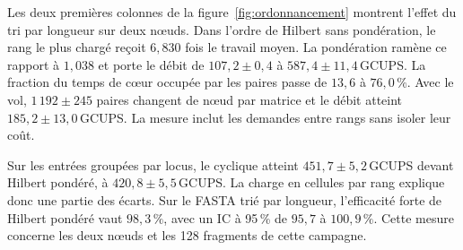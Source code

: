 Les deux premières colonnes de la figure~\ref{fig:ordonnancement} montrent l'effet du tri par longueur sur deux nœuds. Dans l’ordre de Hilbert sans pondération, le rang le plus chargé reçoit \(6{,}830\) fois le travail moyen. La pondération ramène ce rapport à \(1{,}038\) et porte le débit de \(107{,}2\pm0{,}4\) à \(587{,}4\pm11{,}4\)\,GCUPS. La fraction du temps de cœur occupée par les paires passe de \(13{,}6\) à \(76{,}0\,\%\). Avec le vol, \(1\,192\pm245\) paires changent de nœud par matrice et le débit atteint \(185{,}2\pm13{,}0\)\,GCUPS. La mesure inclut les demandes entre rangs sans isoler leur coût.

Sur les entrées groupées par locus, le cyclique atteint \(451{,}7\pm5{,}2\)\,GCUPS devant Hilbert pondéré, à \(420{,}8\pm5{,}5\)\,GCUPS. La charge en cellules par rang explique donc une partie des écarts. Sur le FASTA trié par longueur, l'efficacité forte de Hilbert pondéré vaut \(98{,}3\,\%\), avec un IC à 95\,\% de \(95{,}7\) à \(100{,}9\,\%\). Cette mesure concerne les deux nœuds et les 128 fragments de cette campagne.

